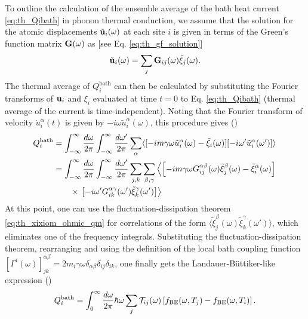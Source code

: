 To outline the calculation of the ensemble average of the bath heat current \eqref{eq:th_Qibath} in phonon thermal conduction, we assume that the solution for the atomic displacements $\tilde{\mathbf{u}}_i(\omega)$ at each site $i$ is given in terms of the Green's function matrix $\mathbf{G}(\omega)$ as [see Eq. \eqref{eq:th_gf_solution}]
\begin{equation}
 \tilde{\mathbf{u}}_i(\omega) = \sum_{j} \mathbf{G}_{ij}(\omega) \tilde{\xi}_j(\omega).
\end{equation}
The thermal average of $Q_i^{\textrm{bath}}$ can then be calculated by substituting the Fourier transforms of $\mathbf{u}_i$ and $\xi_i$ evaluated at time $t=0$ to Eq. \eqref{eq:th_Qibath} (thermal average of the current is time-independent). Noting that the Fourier transform of velocity $\dot{u}_i^{\alpha}(t)$ is given by $-i\omega \tilde{u}^{\alpha}_i(\omega)$, this procedure gives ()
\begin{alignat}{2}
 Q_i^{\textrm{bath}}  &= \int_{-\infty}^{\infty} \frac{d\omega}{2\pi} \int_{-\infty}^{\infty} \frac{d\omega'}{2\pi} \sum_{\alpha} \langle  [ -im\gamma\omega \tilde u_i^{\alpha}(\omega)-\tilde \xi_i(\omega)][-i\omega' \tilde u_i^{\alpha}(\omega')] \rangle \\
  &= \int_{-\infty}^{\infty} \frac{d\omega}{2\pi} \int_{-\infty}^{\infty} \frac{d\omega'}{2\pi} \sum_{j,k} \sum_{\beta,\gamma} \left\langle \left[ -im\gamma\omega G_{ij}^{\alpha\beta}(\omega)\tilde \xi_j^{\beta}(\omega)-\tilde \xi_i^{\alpha}(\omega) \right] \right. \notag \\
  &\qquad \times \left.\left[-i\omega' G_{ik}^{\alpha\gamma}(\omega') \tilde \xi_k^{\gamma}(\omega') \right]  \right\rangle
\end{alignat}
At this point, one can use the fluctuation-dissipation theorem \eqref{eq:th_xixiom_ohmic_qm} for correlations of the form $\langle \tilde \xi_j^{\beta}(\omega)\tilde \xi_k^{\gamma}(\omega') \rangle$, which eliminates one of the frequency integrals. Substituting the fluctuation-dissipation theorem, rearranging and using the definition of the local bath coupling function $[\Gamma^i(\omega)]_{jk}^{\alpha\beta}=2m_i\gamma\omega \delta_{\alpha\beta}\delta_{ij} \delta_{ik}$, one finally gets the Landauer-B\"uttiker-like \cite{landauer57,buttiker92} expression ()
\begin{equation}
  Q_i^{\textrm{bath}} = \int_0^{\infty} \frac{d\omega}{2\pi} \hbar \omega  \sum_j \mathcal{T}_{ij}(\omega) \left[ f_{\textrm{BE}}(\omega,T_j)- f_{\textrm{BE}}(\omega,T_i)\right]. \label{eq:th_QI}
\end{equation}
